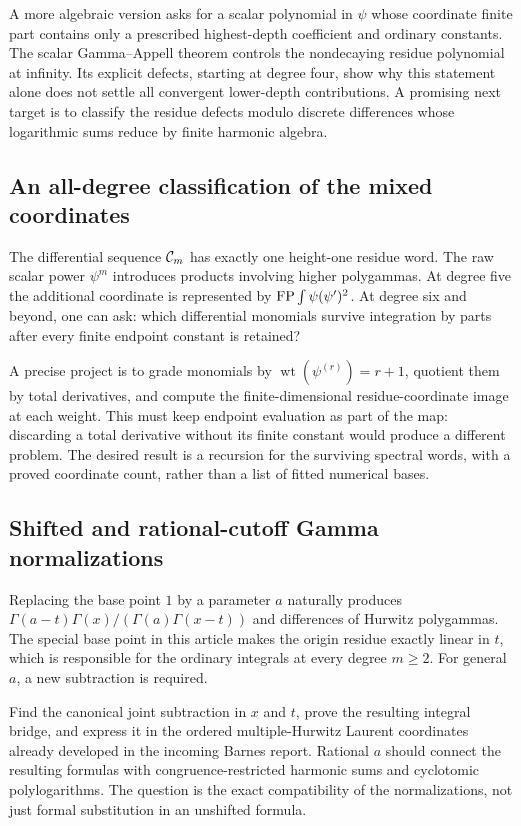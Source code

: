 A more algebraic version asks for a scalar polynomial in $\psi$
whose coordinate finite part contains only a prescribed highest-depth
coefficient and ordinary constants. The scalar Gamma--Appell theorem
controls the nondecaying residue polynomial at infinity. Its explicit
defects, starting at degree four, show why this statement alone does
not settle all convergent lower-depth contributions. A promising
next target is to classify the residue defects modulo discrete
differences whose logarithmic sums reduce by finite harmonic algebra.

\subsection{An all-degree classification of the mixed coordinates}

The differential sequence $\mathcal C_m$ has exactly one height-one residue
word. The raw scalar power $\psi^m$ introduces products involving
higher polygammas. At degree five the additional coordinate is represented
by $\operatorname{FP}\int\psi(\psi')^2$. At degree six and beyond, one can ask:
which differential monomials survive integration by parts after every
finite endpoint constant is retained?

A precise project is to grade monomials by
$\operatorname{wt}(\psi^{(r)})=r+1$, quotient them by total
derivatives, and compute the finite-dimensional residue-coordinate
image at each weight. This must keep endpoint evaluation as part of
the map: discarding a total derivative without its finite constant
would produce a different problem. The desired result is a recursion
for the surviving spectral words, with a proved coordinate count,
rather than a list of fitted numerical bases.

\subsection{Shifted and rational-cutoff Gamma normalizations}

Replacing the base point $1$ by a parameter $a$ naturally produces
$\Gamma(a-t)\Gamma(x)/(\Gamma(a)\Gamma(x-t))$ and differences
of Hurwitz polygammas. The special base point in this article makes
the origin residue exactly linear in $t$, which is responsible for
the ordinary integrals at every degree $m\ge2$. For general $a$, a
new subtraction is required.

Find the canonical joint subtraction in $x$ and $t$, prove the
resulting integral bridge, and express it in the ordered
multiple-Hurwitz Laurent coordinates already developed in the
incoming Barnes report. Rational $a$ should connect the resulting
formulas with congruence-restricted harmonic sums and cyclotomic
polylogarithms. The question is the exact compatibility of the
normalizations, not just formal substitution in an unshifted formula.

